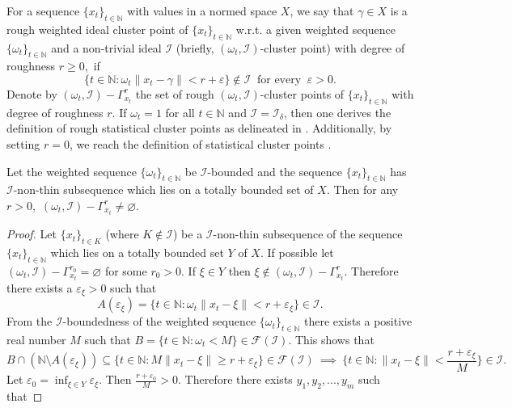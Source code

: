 \documentclass[reqno]{amsart}
\begin{document}
{\begin{definition}\label{Def 2.2} 
For a sequence $\{x_t\}_{t\in\mathbb{N}}$ with values in a normed space $X$, we say that $\gamma\in X$ is  a rough weighted ideal cluster point of  $\{x_t\}_{t\in\mathbb{N}}$  w.r.t. a given weighted sequence $\{\omega_t\}_{t\in\mathbb{N}}$ and a  non-trivial ideal $\mathcal{I}$ (briefly, $(\omega_t,\mathcal{I})$-cluster point)
with degree of roughness $r\geq 0,$ if 
$$\{t\in\mathbb{N}:\omega_t\|x_t-\gamma\|<r+\varepsilon\}\notin\mathcal{I}~\mbox{ for every }~\varepsilon>0.$$
Denote by $(\omega_t,\mathcal{I})-\Gamma_{x_t}^r$ the set of rough $(\omega_t,\mathcal{I})$-cluster points of $\{x_t\}_{t\in\mathbb{N}}$ with degree of roughness $r$.
If \(\omega_{t} = 1\) for all \(t \in \mathbb{N}\) and \(\mathcal{I} = \mathcal{I}_{\delta}\), then one derives the definition of  rough statistical cluster points as delineated in \cite{aytar2017rough}. Additionally, by setting $r = 0$, we reach the definition of statistical cluster points \cite{fridy1993statistical}.
\end{definition}


\begin{theorem}\label{Non-empty} Let the weighted sequence  $\{\omega_t\}_{t\in\mathbb{N}}$ be $\mathcal{I}$-bounded and the sequence $\{x_t\}_{t\in\mathbb{N}}$ has $\mathcal{I}$-non-thin subsequence which lies on a totally bounded set of $X.$ Then for any  $r>0,$ $(\omega_t,\mathcal{I})-\Gamma_{x_t}^r\neq \varnothing.$
\end{theorem}


\begin{proof} Let $\{x_t\}_{t\in K}$ (where $K\not\in \mathcal{I}$) be a $\mathcal{I}$-non-thin subsequence of the sequence $\{x_t\}_{t\in\mathbb{N}}$ which lies on a totally bounded set $Y$ of $X.$  If possible let $(\omega_t,\mathcal{I})-\Gamma_{x_t}^{r_0}= \varnothing$ for some $r_0>0.$ If $\xi \in Y$ then $\xi \not\in (\omega_t,\mathcal{I})-\Gamma_{x_t}^r.$ Therefore there exists a $\varepsilon_{\xi}>0$ such that $$A(\varepsilon_{\xi})=\{t\in\mathbb{N}:\omega_t\|x_t-\xi\|<r+\varepsilon_{\xi}\}\in\mathcal{I}.$$
	From the $\mathcal{I}$-boundedness of the weighted sequence  $\{\omega_t\}_{t\in\mathbb{N}}$ there exists a positive real number $M$ such that $B=\{t\in \mathbb{N}: \omega_t<M\}\in \mathcal{F(\mathcal{I})}.$ This shows that $$B\cap (\mathbb{N}\setminus A(\varepsilon_{\xi}))\subseteq \{t\in\mathbb{N}:M\|x_t-\xi\|\geq r+\varepsilon_{\xi}\} \in \mathcal{F(\mathcal{I})}~\implies~ \{t\in\mathbb{N}:\|x_t-\xi\|<\frac{r+\varepsilon_{\xi}}{M}\}\in  \mathcal{I}.$$
	Let $\varepsilon_0=\displaystyle{\inf_{\xi \in Y}} \varepsilon_{\xi}.$ Then $\frac{r+\varepsilon_{0}}{M}>0.$ Therefore there exists $y_1,y_2,...,y_m$ such that
	

\end{proof}}
\end{document}
